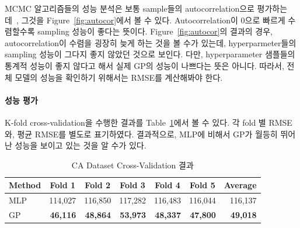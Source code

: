 \documentclass[ba]{imsart}
\begin{document}
MCMC 알고리즘들의 성능 분석은 보통 sample들의 autocorrelation으로 평가하는데~\citep{geyer_practical_1992}, 그것을 Figure~\ref{fig:autocor}에서 볼 수 있다.
Autocorrelation이 0으로 빠르게 수렴할수록 sampling 성능이 좋다는 뜻이다.
Figure~\ref{fig:autocor}의 결과의 경우, autocorrelation이 수렴을 굉장히 늦게 하는 것을 볼 수가 있는데, hyperparmeter들의 sampling 성능이 그다지 좋지 않았던 것으로 보인다.
다만, hyperparameter 샘플들의 통계적 성능이 좋지 않다고 해서 실제 GP의 성능이 나쁘다는 뜻은 아니다.
따라서, 전체 모델의 성능을 확인하기 위해서는 RMSE를 계산해봐야 한다.

\paragraph{성능 평가}
K-fold cross-validation을 수행한 결과를 Table~\ref{table:cv}에서 볼 수 있다.
각 fold 별 RMSE와, 평균 RMSE를 별도로 표기하였다.
결과적으로, MLP에 비해서 GP가 월등히 뛰어난 성능을 보이고 있는 것을 알 수가 있다.

\begin{table}
  \centering
  \begin{threeparttable}
    \caption{CA Dataset Cross-Validation 결과}\label{table:cv}
    \begin{tabular}{l|rrrrr|r} \toprule
      \multicolumn{1}{c}{\textbf{Method}}
      & \multicolumn{1}{c}{\textbf{Fold 1}}
      & \multicolumn{1}{c}{\textbf{Fold 2}}
      & \multicolumn{1}{c}{\textbf{Fold 3}}
      & \multicolumn{1}{c}{\textbf{Fold 4}}
      & \multicolumn{1}{c}{\textbf{Fold 5}}
      & \multicolumn{1}{c}{\textbf{Average}}
      \\ \midrule
      MLP & 114,027 & 116,850 & 117,282 & 116,483 & 116,044 & 116,137 \\
      GP  & \textbf{46,116}	& \textbf{48,864}  & \textbf{53,973} &  \textbf{48,337}  & \textbf{47,800}  & \textbf{49,018}
      \\ \bottomrule

    \end{tabular}
  \end{threeparttable}
\end{table}



\end{document}
